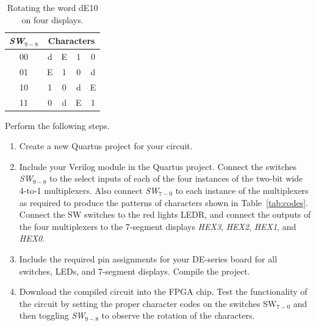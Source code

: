 \documentclass[epsfig,10pt,fullpage]{article}
\begin{document}
\begin{table}[H]
\begin{minipage}[t]{12.5 cm}
\begin{center}
\begin{tabular}{c|cccc}
{\it SW}$_{9-8}$ & \multicolumn{4}{c}{Characters} \\
\hline
{\rule[0mm]{0mm}{5mm}00} & d & E & 1 & 0\\ 
01 & E & 1 & 0 & d\\
10 & 1 & 0 & d & E\\
11 & 0 & d & E & 1\\
\end{tabular}
\end{center}
\end{minipage}
\caption{Rotating the word dE10 on four displays.}
\label{tab:rotate}
\end{table}

Perform the following steps.
\begin{enumerate}
\item Create a new Quartus project for your circuit.
\item Include your Verilog module in the Quartus project. Connect the switches 
{\it SW}$_{9-8}$ to the select inputs of each of the four instances of the two-bit 
wide 4-to-1 multiplexers. Also connect {\it SW}$_{7-0}$ to each instance of the
multiplexers as required to produce the patterns of characters shown in Table~\ref{tab:codes}.
Connect the SW switches to the red lights LEDR, and connect the outputs of the four 
multiplexers to the 7-segment displays {\it HEX3}, {\it HEX2}, {\it HEX1}, and {\it HEX0}.
\item Include the required pin assignments for your DE-series board for all switches, LEDs, 
and 7-segment displays. Compile the project.
\item Download the compiled circuit into the FPGA chip. Test the functionality of the 
circuit by setting the proper character codes on the switches SW$_{7-0}$ and then 
toggling {\it SW}$_{9-8}$ to observe the rotation of the characters.
\end{enumerate}
\end{document}
